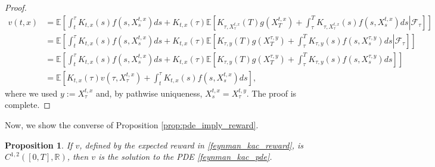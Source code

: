 \documentclass{article}
\newtheorem{prop}{Proposition}
\begin{document}
\begin{proof}
\begin{equation*}
\begin{aligned}
v(t,x)&=\mathbb{E}\left[\int^\tau_tK_{t,x}(s)f(s,X_s^{t,x})ds+K_{t,x}(\tau)\left.\mathbb{E}\left[K_{\tau,X_\tau^{t,x}}(T)g(X_T^{t,x})+\int^T_\tau K_{\tau,X_\tau^{t,x}}(s)f(s,X_s^{t,x})ds\right\vert\mathcal{F}_\tau\right]\right]\\
&=\mathbb{E}\left[\int^\tau_tK_{t,x}(s)f(s,X_s^{t,x})ds+K_{t,x}(\tau)\left.\mathbb{E}\left[K_{\tau,y}(T)g(X_T^{\tau,y})+\int^T_\tau K_{\tau,y}(s)f(s,X_s^{\tau,y})ds\right\vert\mathcal{F}_\tau\right]\right]\\
&=\mathbb{E}\left[\int^\tau_tK_{t,x}(s)f(s,X_s^{t,x})ds+K_{t,x}(\tau)\mathbb{E}\left[K_{\tau,y}(T)g(X_T^{\tau,y})+\int^T_\tau K_{\tau,y}(s)f(s,X_s^{\tau,y})ds\right]\right]\\
&=\mathbb{E}\left[K_{t,x}(\tau)v(\tau,X_\tau^{t,x})+\int^\tau_tK_{t,x}(s)f(s,X_s^{t,x})ds\right],
\end{aligned}
\end{equation*}
where we used $y:=X_\tau^{t,x}$ and, by pathwise uniqueness, $X_s^{t,x}=X_\tau^{t,y}$. The proof is complete.
\end{proof}

Now, we show the converse of Proposition \ref{prop:pde_imply_reward}.

\begin{prop}
If $v$, defined by the expected reward in \eqref{feynman_kac_reward}, is $C^{1,2}([0,T],\mathbb{R})$, then $v$ is the solution to the PDE \eqref{feynman_kac_pde}.
\end{prop}
\end{document}
